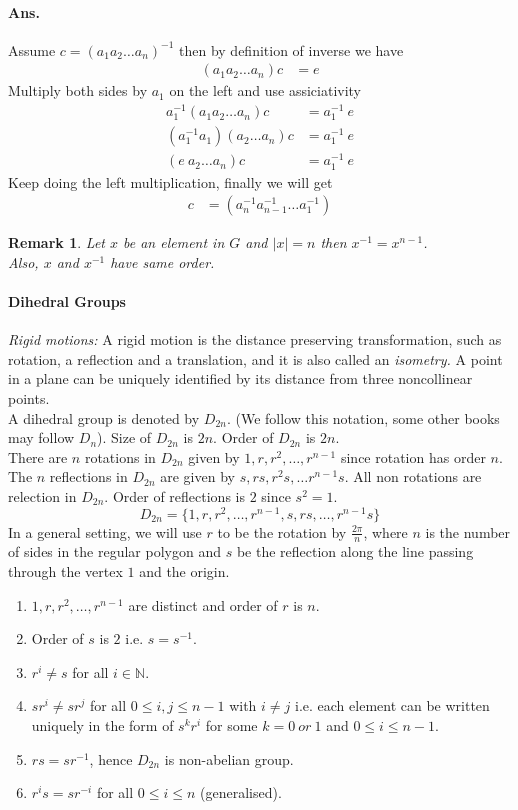 \documentclass[12pt]{report}
\newtheorem*{rem}{Remark}
\begin{document}
\paragraph*{Ans. } Assume $c = (a_1 a_2 \dots a_n)^{-1}$ then by definition of inverse we have 
\begin{align*}
    (a_1 a_2 \dots a_n) c &= e
\end{align*}
Multiply both sides by $a_1$ on the left and use assiciativity 
\begin{align*}
    a_1^{-1}(a_1 a_2 \dots a_n)c &= a_1^{-1}~e\\
    (a_1^{-1}a_1)(a_2 \dots a_n)c &= a_1^{-1}~e\\
    (e~a_2 \dots a_n)c &= a_1^{-1}~e
\end{align*}
Keep doing the left multiplication, finally we will get
\begin{align*}
    c &= (a_n^{-1} a_{n-1}^{-1} \dots a_1^{-1})
\end{align*}
\begin{rem}
    Let $x$ be an element in $G$ and $|x| = n$ then $x^{-1} = x^{n-1}$.\\
    Also, $x$ and $x^{-1}$ have same order.
\end{rem}
\paragraph*{Dihedral Groups}
{\em Rigid motions:} A rigid motion is the distance preserving transformation, such as rotation, a reflection and a translation, and it is also called an {\em isometry.} A point in a plane can be uniquely identified by its distance from three noncollinear points.\\
A dihedral group is denoted by $D_{2n}$. (We follow this notation, some other books may follow $D_n$). Size of $D_{2n}$ is $2n$. Order of $D_{2n}$ is $2n$.\\
There are $n$ rotations in $D_{2n}$ given by $1, r, r^2, \dots, r^{n-1}$ since rotation has order $n$.\\
The $n$ reflections in $D_{2n}$ are given by $s, rs, r^2s, \dots r^{n-1}s$. All non rotations are relection in $D_{2n}$. Order of reflections is $2$ since $s^2 = 1$.
$$ D_{2n} = \{1,r, r^2, \dots, r^{n-1},s,rs,\dots, r^{n-1}s\} $$
In a general setting, we will use $r$ to be the rotation by $\frac{2\pi}{n}$, where $n$ is the number of sides in the regular polygon and $s$ be the reflection along the line passing through the vertex $1$ and the origin.
\begin{enumerate}
    \item $1,r, r^2, \dots, r^{n-1}$ are distinct and order of $r$ is $n$.
    \item Order of $s$ is $2$ i.e. $s = s^{-1}$.
    \item $r^i \neq s$ for all $i \in \mathbb{N}.$
    \item  $sr^i \neq sr^j$ for all $0 \leq i,j \leq n-1$ with $i \neq j$ i.e. each element can be written uniquely in the form of $s^kr^i$ for some $k = 0 ~or~1$ and $0 \leq i \leq n-1$.
    \item $rs = sr^{-1}$, hence $D_{2n}$ is non-abelian group.
    \item $r^is = sr^{-i}$ for all $0 \leq i \leq n$ (generalised). 
\end{enumerate}
\end{document}
